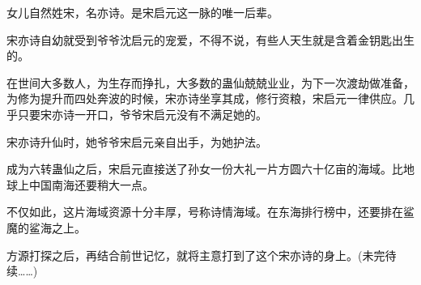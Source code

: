 \begin{this_body}
女儿自然姓宋，名亦诗。是宋启元这一脉的唯一后辈。

宋亦诗自幼就受到爷爷沈启元的宠爱，不得不说，有些人天生就是含着金钥匙出生的。

在世间大多数人，为生存而挣扎，大多数的蛊仙兢兢业业，为下一次渡劫做准备，为修为提升而四处奔波的时候，宋亦诗坐享其成，修行资粮，宋启元一律供应。几乎只要宋亦诗一开口，爷爷宋启元没有不满足她的。

宋亦诗升仙时，她爷爷宋启元亲自出手，为她护法。

成为六转蛊仙之后，宋启元直接送了孙女一份大礼一片方圆六十亿亩的海域。比地球上中国南海还要稍大一点。

不仅如此，这片海域资源十分丰厚，号称诗情海域。在东海排行榜中，还要排在鲨魔的鲨海之上。

方源打探之后，再结合前世记忆，就将主意打到了这个宋亦诗的身上。(未完待续……)

\end{this_body}

